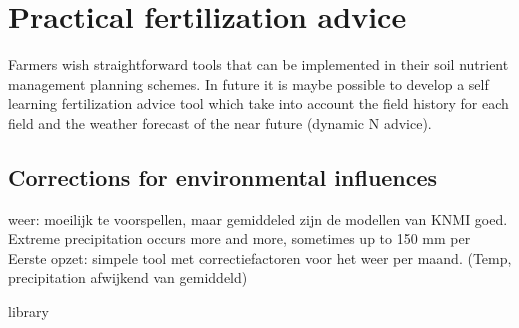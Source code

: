 \documentclass[10pt,twoside,dutch,english]{report}
\begin{document}
	\section{Practical fertilization advice}
	Farmers wish straightforward tools that can be implemented in their soil nutrient management planning schemes. In future it is maybe possible to develop a self learning fertilization advice tool which take into account the field history for each field and the weather forecast of the near future (dynamic N advice). 
    
    \subsection{Corrections for environmental influences}
	weer: moeilijk te voorspellen, maar gemiddeled zijn de modellen van KNMI goed. Extreme precipitation occurs more and more, sometimes up to 150 mm per
    Eerste opzet: simpele tool met correctiefactoren voor het weer per maand. (Temp, precipitation afwijkend van gemiddeld)



\linespread{1.0}
\footnotesize 
{}

 {library}
\normalsize 
\linespread{1.3}
\end{document}

